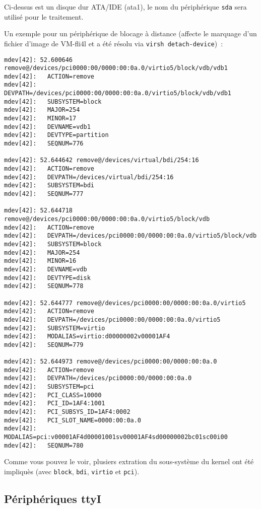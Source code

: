 Ci-dessus est un disque dur ATA/IDE (ata1), le nom du périphérique \texttt{sda} sera utilisé
pour le traitement.

Un exemple pour un périphérique de blocage à distance (affecte le marquage d'un fichier d'image
de VM-fli4l et a été résolu via \texttt{virsh detach-device})~:

\begin{scriptsize}
\begin{verbatim}
mdev[42]: 52.600646 remove@/devices/pci0000:00/0000:00:0a.0/virtio5/block/vdb/vdb1
mdev[42]:   ACTION=remove
mdev[42]:   DEVPATH=/devices/pci0000:00/0000:00:0a.0/virtio5/block/vdb/vdb1
mdev[42]:   SUBSYSTEM=block
mdev[42]:   MAJOR=254
mdev[42]:   MINOR=17
mdev[42]:   DEVNAME=vdb1
mdev[42]:   DEVTYPE=partition
mdev[42]:   SEQNUM=776

mdev[42]: 52.644642 remove@/devices/virtual/bdi/254:16
mdev[42]:   ACTION=remove
mdev[42]:   DEVPATH=/devices/virtual/bdi/254:16
mdev[42]:   SUBSYSTEM=bdi
mdev[42]:   SEQNUM=777

mdev[42]: 52.644718 remove@/devices/pci0000:00/0000:00:0a.0/virtio5/block/vdb
mdev[42]:   ACTION=remove
mdev[42]:   DEVPATH=/devices/pci0000:00/0000:00:0a.0/virtio5/block/vdb
mdev[42]:   SUBSYSTEM=block
mdev[42]:   MAJOR=254
mdev[42]:   MINOR=16
mdev[42]:   DEVNAME=vdb
mdev[42]:   DEVTYPE=disk
mdev[42]:   SEQNUM=778

mdev[42]: 52.644777 remove@/devices/pci0000:00/0000:00:0a.0/virtio5
mdev[42]:   ACTION=remove
mdev[42]:   DEVPATH=/devices/pci0000:00/0000:00:0a.0/virtio5
mdev[42]:   SUBSYSTEM=virtio
mdev[42]:   MODALIAS=virtio:d00000002v00001AF4
mdev[42]:   SEQNUM=779

mdev[42]: 52.644973 remove@/devices/pci0000:00/0000:00:0a.0
mdev[42]:   ACTION=remove
mdev[42]:   DEVPATH=/devices/pci0000:00/0000:00:0a.0
mdev[42]:   SUBSYSTEM=pci
mdev[42]:   PCI_CLASS=10000
mdev[42]:   PCI_ID=1AF4:1001
mdev[42]:   PCI_SUBSYS_ID=1AF4:0002
mdev[42]:   PCI_SLOT_NAME=0000:00:0a.0
mdev[42]:   MODALIAS=pci:v00001AF4d00001001sv00001AF4sd00000002bc01sc00i00
mdev[42]:   SEQNUM=780
\end{verbatim}
\end{scriptsize}

Comme vous pouvez le voir, plusiers extration du sous-système du kernel ont été impliquès
(avec \texttt{block}, \texttt{bdi}, \texttt{virtio} et \texttt{pci}).

\subsection{Périphériques ttyI}

